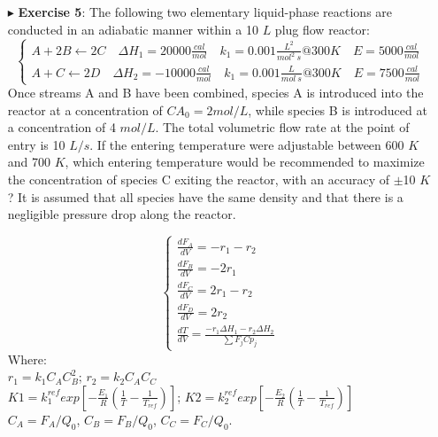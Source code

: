 \documentclass[xcolor={dvipsnames,rgb}, aspectratio=169]{beamer}
\begin{document}
\begin{frame}{}
   \begin{itemize}
      \item[$\blacktriangleright$] \textbf{Exercise 5}: \small{The following two
         elementary liquid-phase reactions are conducted in an adiabatic manner within a
         10 $L$ plug flow reactor:}
         \begin{equation*}
            \begin{cases*}
               A+2B\longleftarrow2C \quad \Delta H_{1} = 20000\frac{cal}{mol}  \quad
               k_{1} = 0.001\frac{L^{2}}{mol^{2}\:s}@ 300K \quad E = 5000\frac{cal}{mol} \\
               A+C\longleftarrow2D \quad \Delta H_{2}  = -10000\frac{cal}{mol} \quad
               k_{1} = 0.001\frac{L}{mol\:s}@ 300K \quad E = 7500\frac{cal}{mol}
            \end{cases*}
         \end{equation*}
         \small{Once streams A and B have been combined, species A is introduced into the
         reactor at a concentration of $CA_{0} = 2 mol/L$, while species B is introduced
         at a concentration of 4 $mol/L$. The total volumetric flow rate at the point of
         entry is 10 $L/s$. If the entering temperature were adjustable between 600 $K$
         and 700 $K$, which entering temperature would be recommended to maximize the
         concentration of species C exiting the reactor, with an accuracy of $\pm$10 $K$?
         It is assumed that all species have the same density and that there is a
         negligible pressure drop along the reactor.}
   \end{itemize}
\end{frame}

\begin{frame}{}
   \begin{itemize}
      \item[ ]
         \begin{equation*}
            \begin{cases}
               \frac{dF_{A}}{dV} = -r_{1} - r_{2} \\
               \frac{dF_{B}}{dV} = -2r_{1} \\
               \frac{dF_{C}}{dV} = 2r_{1} - r_{2} \\
               \frac{dF_{D}}{dV} = 2r_{2} \\
               \frac{dT}{dV} = \frac{-r_{1}\Delta H_{1} - r_{2}\Delta H_{2}}{\sum F_{j}Cp_{j}}
            \end{cases}
         \end{equation*}
         Where:\\
         $r_{1} = k_{1}C_{A}C_{B}^{2}$; $r_{2} = k_{2}C_{A}C_{C}$\\
         $K1=k_{1}^{ref}exp\left[-\frac{E_{1}}{R}\left(\frac{1}{T}-\frac{1}{T_{ref}}\right)\right]$;
         $K2=k_{2}^{ref}exp\left[-\frac{E_{2}}{R}\left(\frac{1}{T}-\frac{1}{T_{ref}}\right)\right]$\\
         $C_{A} = F_{A}/Q_{0}$, $C_{B} = F_{B}/Q_{0}$, $C_{C} = F_{C}/Q_{0}$.
   \end{itemize}
\end{frame}
\end{document}
